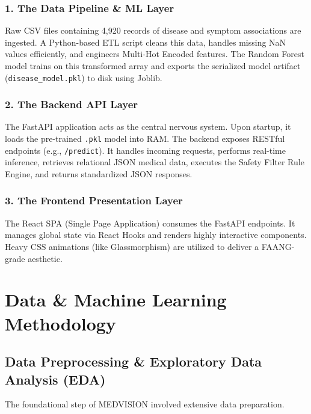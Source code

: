 \documentclass[12pt,a4paper]{report}
\begin{document}
\subsection{1. The Data Pipeline \& ML Layer}
Raw CSV files containing 4,920 records of disease and symptom associations are ingested. A Python-based ETL script cleans this data, handles missing NaN values efficiently, and engineers Multi-Hot Encoded features. The Random Forest model trains on this transformed array and exports the serialized model artifact (\texttt{disease\_model.pkl}) to disk using Joblib.

\subsection{2. The Backend API Layer}
The FastAPI application acts as the central nervous system. Upon startup, it loads the pre-trained \texttt{.pkl} model into RAM. The backend exposes RESTful endpoints (e.g., \texttt{/predict}). It handles incoming requests, performs real-time inference, retrieves relational JSON medical data, executes the Safety Filter Rule Engine, and returns standardized JSON responses.

\subsection{3. The Frontend Presentation Layer}
The React SPA (Single Page Application) consumes the FastAPI endpoints. It manages global state via React Hooks and renders highly interactive components. Heavy CSS animations (like Glassmorphism) are utilized to deliver a FAANG-grade aesthetic.

\chapter{Data \& Machine Learning Methodology}

\section{Data Preprocessing \& Exploratory Data Analysis (EDA)}
The foundational step of MEDVISION involved extensive data preparation. 
\end{document}
